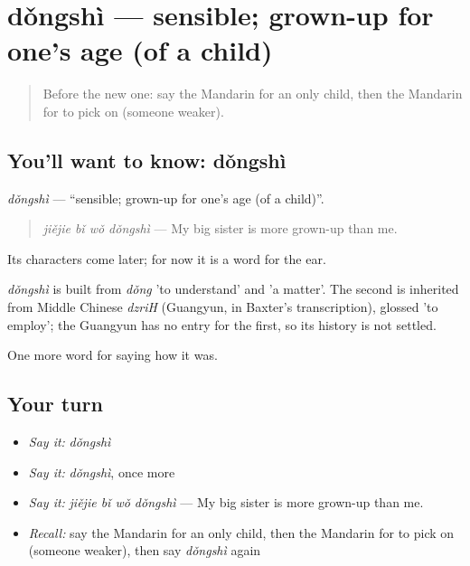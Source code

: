 \section[dǒngshì]{dǒngshì — sensible; grown-up for one's age (of a child)}

\label{lesson:ZH-C508-dongshi}



\begin{quote}
Before the new one: say the Mandarin for an only child, then the Mandarin for to pick on (someone weaker).
\end{quote}

\subsection*{You'll want to know: dǒngshì}
\emph{dǒngshì} — \textquotedblleft{}sensible; grown-up for one's age (of a child)\textquotedblright{}.

\begin{quote}
\emph{jiějie bǐ wǒ dǒngshì} — My big sister is more grown-up than me.
\end{quote}

Its characters come later; for now it is a word for the ear.

\begin{cousinweb}
\emph{dǒngshì} is built from \emph{dǒng} 'to understand' and  'a matter'. The second is inherited from Middle Chinese \emph{dzriH} (Guangyun, in Baxter's transcription), glossed 'to employ'; the Guangyun has no entry for the first, so its history is not settled.
\end{cousinweb}

\begin{grammarlens}[title={What you've built}]
One more word for saying how it was.
\end{grammarlens}

\subsection*{Your turn}
\begin{itemize}
\raggedright
  \item \emph{Say it:} \emph{dǒngshì}
  \item \emph{Say it:} \emph{dǒngshì}, once more
  \item \emph{Say it:} \emph{jiějie bǐ wǒ dǒngshì} — My big sister is more grown-up than me.
  \item \emph{Recall:} say the Mandarin for an only child, then the Mandarin for to pick on (someone weaker), then say \emph{dǒngshì} again
\end{itemize}

